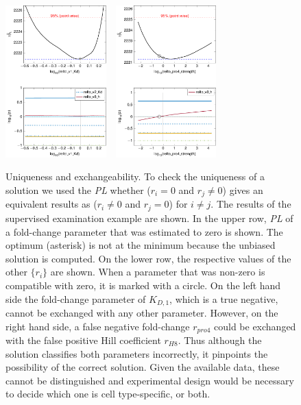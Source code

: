 \documentclass{bioinfo}
\begin{document}
\begin{figure}[!tpb]%
\centerline{\includegraphics[width=110pt]{Figures/uniqueness_1.pdf}~~\includegraphics[width=110pt]{Figures/uniqueness.pdf}}
\caption{Uniqueness and exchangeability. To check the uniqueness of a solution we used the \emph{PL} whether ($r_i=0$ and $r_j\neq0$) gives an equivalent results as ($r_i\neq0$ and $r_j=0$) for $i\neq j$. The results of the supervised examination example are shown. In the upper row, \emph{PL} of a fold-change parameter that was estimated to zero is shown. The optimum (asterisk) is not at the minimum because the unbiased solution is computed. On the lower row, the respective values of the other $\{r_i\}$ are shown. When a parameter that was non-zero is compatible with zero, it is marked with a circle. On the left hand side the fold-change parameter of $K_{D,1}$, which is a true negative, cannot be exchanged with any other parameter. However, on the right hand side, a false negative fold-change $r_{pro4}$ could be exchanged with the false positive Hill coefficient $r_{H8}$. Thus although the solution classifies both parameters incorrectly, it pinpoints the possibility of the correct solution. Given the available data, these cannot be distinguished and experimental design would be necessary to decide which one is cell type-specific, or both.}\label{fig:07}
\end{figure}
\end{document}
